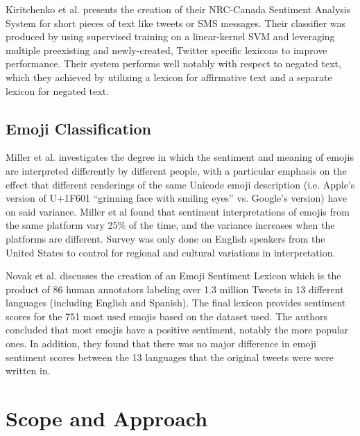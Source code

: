 \documentclass[10pt]{article}
\begin{document}
Kiritchenko et al. \cite{kiritchenko2014sentiment} presents the creation of their NRC-Canada Sentiment Analysis System for short pieces of text like tweets or SMS messages. Their classifier was produced by using supervised training on a linear-kernel SVM and leveraging multiple preexisting and newly-created, Twitter specific lexicons to improve performance. Their system performs well notably with respect to negated text, which they achieved by utilizing a lexicon for affirmative text and a separate lexicon for negated text.

\subsection{Emoji Classification}

Miller et al. \cite{miller2016blissfully} investigates the degree in which the sentiment and meaning of emojis are interpreted differently by different people, with a particular emphasis on the effect that different renderings of the same Unicode emoji description (i.e. Apple’s version of U+1F601 “grinning face with smiling eyes” vs. Google’s version) have on said variance. Miller et al found that sentiment interpretations of emojis from the same platform vary 25\% of the time, and the variance increases when the platforms are different. Survey was only done on English speakers from the United States to control for regional and cultural variations in interpretation.

Novak et al. \cite{novak2015sentiment} discusses the creation of an Emoji Sentiment Lexicon which is the product of 86 human annotators labeling over 1.3 million Tweets in 13 different languages (including English and Spanish). The final lexicon provides sentiment scores for the 751 most used emojis based on the dataset used. The authors concluded that most emojis have a positive sentiment, notably the more popular ones. In addition, they found that there was no major difference in emoji sentiment scores between the 13 languages that the original tweets were were written in.

\section{Scope and Approach}

\end{document}
